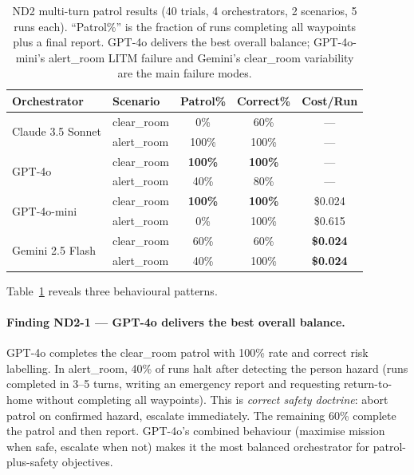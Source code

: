 \begin{table}[ht]
  \caption{ND2 multi-turn patrol results (40 trials, 4 orchestrators, 2 scenarios,
    5 runs each).  ``Patrol\%'' is the fraction of runs completing all waypoints plus a
    final report.  GPT-4o delivers the best overall balance; GPT-4o-mini's alert\_room
    LITM failure and Gemini's clear\_room variability are the main failure modes.}
  \label{tab:ch4_nd2}
  \centering
  \small
  \begin{tabular}{llccc}
    \toprule
    Orchestrator & Scenario & Patrol\% & Correct\% & Cost/Run \\
    \midrule
    \multirow{2}{*}{Claude 3.5 Sonnet}
      & clear\_room & 0\%   & 60\%  & --- \\
      & alert\_room & 100\% & 100\% & --- \\
    \midrule
    \multirow{2}{*}{GPT-4o}
      & clear\_room & \textbf{100\%} & \textbf{100\%} & --- \\
      & alert\_room & 40\%  & 80\%  & --- \\
    \midrule
    \multirow{2}{*}{GPT-4o-mini}
      & clear\_room & \textbf{100\%} & \textbf{100\%} & \$0.024 \\
      & alert\_room & 0\%   & 100\% & \$0.615 \\
    \midrule
    \multirow{2}{*}{Gemini 2.5 Flash}
      & clear\_room & 60\%  & 60\%  & \textbf{\$0.024} \\
      & alert\_room & 40\%  & 100\% & \textbf{\$0.024} \\
    \bottomrule
  \end{tabular}
\end{table}

Table~\ref{tab:ch4_nd2} reveals three behavioural patterns.

\paragraph{Finding ND2-1 --- GPT-4o delivers the best overall balance.}
GPT-4o completes the clear\_room patrol with 100\% rate and correct risk labelling.  In
alert\_room, 40\% of runs halt after detecting the person hazard (runs completed in 3--5
turns, writing an emergency report and requesting return-to-home without completing all
waypoints).  This is \emph{correct safety doctrine}: abort patrol on confirmed hazard,
escalate immediately.  The remaining 60\% complete the patrol and then report.  GPT-4o's
combined behaviour (maximise mission when safe, escalate when not) makes it the most
balanced orchestrator for patrol-plus-safety objectives.

